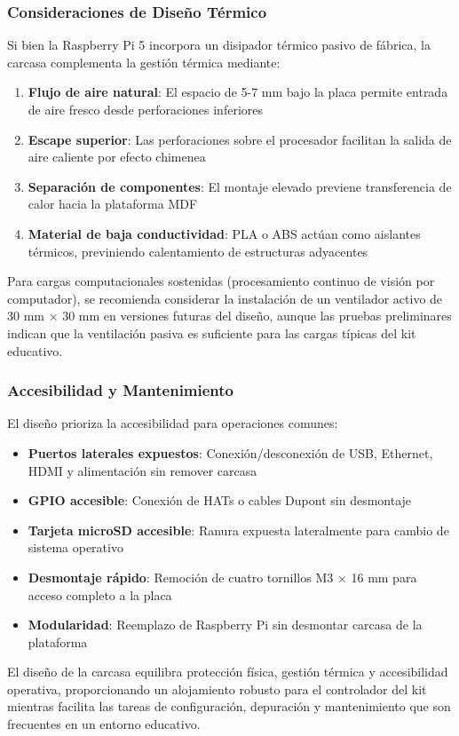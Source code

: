 \subsubsection{Consideraciones de Diseño Térmico}

Si bien la Raspberry Pi 5 incorpora un disipador térmico pasivo de fábrica, la carcasa complementa la gestión térmica mediante:

\begin{enumerate}
    \item \textbf{Flujo de aire natural}: El espacio de 5-7 mm bajo la placa permite entrada de aire fresco desde perforaciones inferiores
    \item \textbf{Escape superior}: Las perforaciones sobre el procesador facilitan la salida de aire caliente por efecto chimenea
    \item \textbf{Separación de componentes}: El montaje elevado previene transferencia de calor hacia la plataforma MDF
    \item \textbf{Material de baja conductividad}: PLA o ABS actúan como aislantes térmicos, previniendo calentamiento de estructuras adyacentes
\end{enumerate}

Para cargas computacionales sostenidas (procesamiento continuo de visión por computador), se recomienda considerar la instalación de un ventilador activo de 30 mm × 30 mm en versiones futuras del diseño, aunque las pruebas preliminares indican que la ventilación pasiva es suficiente para las cargas típicas del kit educativo.

\subsubsection{Accesibilidad y Mantenimiento}

El diseño prioriza la accesibilidad para operaciones comunes:

\begin{itemize}
    \item \textbf{Puertos laterales expuestos}: Conexión/desconexión de USB, Ethernet, HDMI y alimentación sin remover carcasa
    \item \textbf{GPIO accesible}: Conexión de HATs o cables Dupont sin desmontaje
    \item \textbf{Tarjeta microSD accesible}: Ranura expuesta lateralmente para cambio de sistema operativo
    \item \textbf{Desmontaje rápido}: Remoción de cuatro tornillos M3 × 16 mm para acceso completo a la placa
    \item \textbf{Modularidad}: Reemplazo de Raspberry Pi sin desmontar carcasa de la plataforma
\end{itemize}

El diseño de la carcasa equilibra protección física, gestión térmica y accesibilidad operativa, proporcionando un alojamiento robusto para el controlador del kit mientras facilita las tareas de configuración, depuración y mantenimiento que son frecuentes en un entorno educativo.


